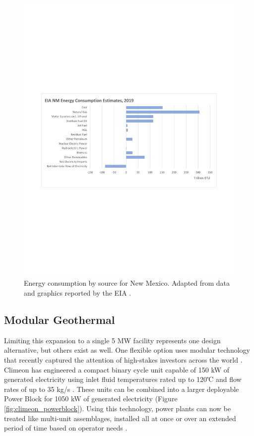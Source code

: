 \begin{figure}[!htp]
\centering
\includegraphics[width=\textwidth]{templates/images/Figure-EIA_NM_Energy_Consumption.pdf}
\caption[NM energy consumption]{Energy consumption by source for New Mexico. Adapted from data and graphics reported by the EIA \protect\citep{eia_new_2021}.}
\label{fig:nm_energy_consumption}
\end{figure}

\subsection{Modular Geothermal}
Limiting this expansion to a single 5 MW facility represents one design alternative, but others exist as well. One flexible option uses modular technology that recently captured the attention of high-stakes investors across the world \citep{shieber_bill_2019}. Climeon has engineered a compact binary cycle unit capable of 150 kW of generated electricity using inlet fluid temperatures rated up to 120℃ and flow rates of up to 35 kg/s \citep{climeon_climeon_2021-1}. These units can be combined into a larger deployable Power Block for 1050 kW of generated electricity \citep{winther_power_2018} (Figure \ref{fig:climeon_powerblock}). Using this technology, power plants can now be treated like multi-unit assemblages, installed all at once or over an extended period of time based on operator needs \citep{climeon_why_2018}.

